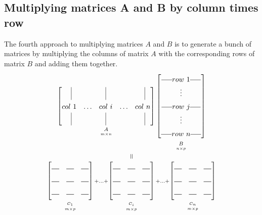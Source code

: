\documentclass[../main.tex]{subfiles}
\begin{document}
\subsection{Multiplying matrices A and B by column times row}
The fourth approach to multiplying matrices \(A\) and \(B\) is to generate a bunch of matrices by multiplying the columns of matrix \(A\) with the corresponding rows of matrix \(B\) and adding them together.
\[
    \renewcommand\arraystretch{1.5}
    \equalto{
    \underbracket[0pt][0pt]{
        \begin{bmatrix}
            \kern.6em\vline &        & \kern.2em\vline\kern.2em &        & \kern.6em\vline \\
            col \ 1         & \ldots & col \ i                  & \ldots & col \ n         \\
            \kern.6em\vline &        & \kern.2em\vline\kern.2em &        & \kern.6em\vline
        \end{bmatrix}
    }_{\mathstrut \underset{m \times n}{A}}
    \underbracket[0pt][0pt]{
        \begin{bmatrix}
            \rule[.5ex]{1.5em}{0.4pt}row \ 1 \rule[.5ex]{1.5em}{0.4pt} \\
            \vdots                                                     \\
            \rule[.5ex]{1.5em}{0.4pt}row \ j \rule[.5ex]{1.5em}{0.4pt} \\
            \vdots                                                     \\
            \rule[.5ex]{1.5em}{0.4pt}row \ n \rule[.5ex]{1.5em}{0.4pt}
        \end{bmatrix}
    }_{\mathstrut \underset{n \times p}{B}}}
    {
    \underbracket[0pt][0pt]{
        \begin{bmatrix}
            \horzbar & \horzbar & \horzbar \\
            \horzbar & \horzbar & \horzbar \\
            \horzbar & \horzbar & \horzbar
        \end{bmatrix}
    }_{\mathstrut \underset{m \times p}{C_1}}
    +
    \ldots
    +
    \underbracket[0pt][0pt]{
        \begin{bmatrix}
            \horzbar & \horzbar & \horzbar \\
            \horzbar & \horzbar & \horzbar \\
            \horzbar & \horzbar & \horzbar
        \end{bmatrix}
    }_{\mathstrut \underset{m \times p}{C_i}}
    +
    \ldots
    +
    \underbracket[0pt][0pt]{
        \begin{bmatrix}
            \horzbar & \horzbar & \horzbar \\
            \horzbar & \horzbar & \horzbar \\
            \horzbar & \horzbar & \horzbar
        \end{bmatrix}
    }_{\mathstrut \underset{m \times p}{C_n}}}
\]
\end{document}
